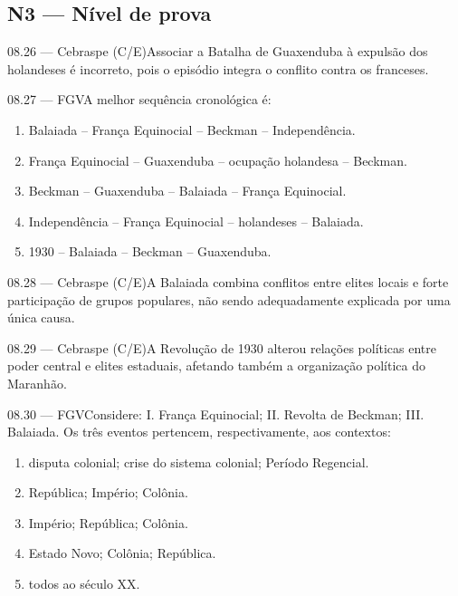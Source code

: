 \subsection*{N3 — Nível de prova}
\begin{questao}{ 08.26 — Cebraspe (C/E)}Associar a Batalha de Guaxenduba à expulsão dos holandeses é incorreto, pois o episódio integra o conflito contra os franceses.\end{questao}
\begin{questao}{ 08.27 — FGV}A melhor sequência cronológica é:\begin{enumerate}[label=\Alph*)]\item Balaiada -- França Equinocial -- Beckman -- Independência.\item França Equinocial -- Guaxenduba -- ocupação holandesa -- Beckman.\item Beckman -- Guaxenduba -- Balaiada -- França Equinocial.\item Independência -- França Equinocial -- holandeses -- Balaiada.\item 1930 -- Balaiada -- Beckman -- Guaxenduba.\end{enumerate}\end{questao}
\begin{questao}{ 08.28 — Cebraspe (C/E)}A Balaiada combina conflitos entre elites locais e forte participação de grupos populares, não sendo adequadamente explicada por uma única causa.\end{questao}
\begin{questao}{ 08.29 — Cebraspe (C/E)}A Revolução de 1930 alterou relações políticas entre poder central e elites estaduais, afetando também a organização política do Maranhão.\end{questao}
\begin{questao}{ 08.30 — FGV}Considere: I. França Equinocial; II. Revolta de Beckman; III. Balaiada. Os três eventos pertencem, respectivamente, aos contextos:\begin{enumerate}[label=\Alph*)]\item disputa colonial; crise do sistema colonial; Período Regencial.\item República; Império; Colônia.\item Império; República; Colônia.\item Estado Novo; Colônia; República.\item todos ao século XX.\end{enumerate}\end{questao}

